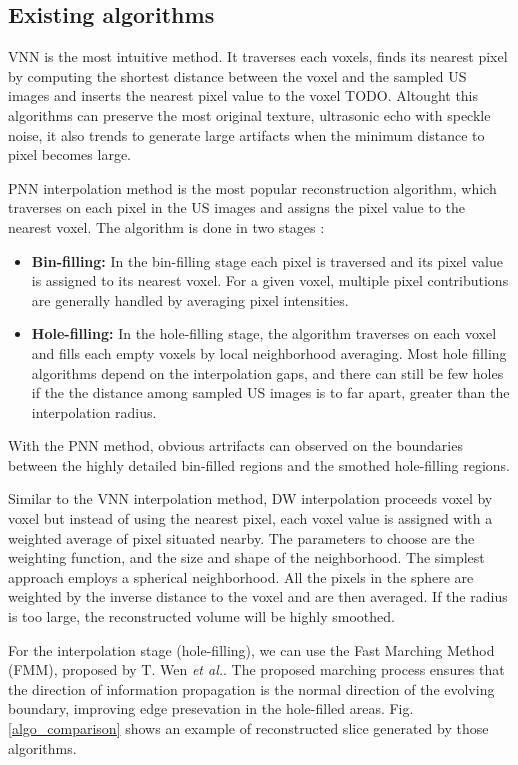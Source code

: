 \documentclass[12pt,journal,compsoc]{IEEEtran}
\begin{document}
\subsection{Existing algorithms}

VNN is the most intuitive method. It traverses each voxels, finds its nearest pixel by computing the shortest distance between the voxel and the sampled US images and inserts the nearest pixel value to the voxel TODO.
Altought this algorithms can preserve the most original texture, ultrasonic echo with speckle noise, it also trends to generate large artifacts when the minimum distance to pixel becomes large.\par

PNN interpolation method is the most popular reconstruction algorithm, which traverses on each pixel in the US images and assigns the pixel value to the nearest voxel.
The algorithm is done in two stages :
\begin{itemize}
	\item \textbf{Bin-filling:} In the bin-filling stage each pixel is traversed and its pixel value is assigned to its nearest voxel. For a given voxel, multiple pixel contributions are generally handled by averaging pixel intensities.  
	\item \textbf{Hole-filling:} In the hole-filling stage, the algorithm traverses on each voxel and fills each empty voxels by local neighborhood averaging. Most hole filling algorithms depend on the interpolation gaps, and there can still be few holes if the the distance among sampled US images is to far apart, greater than the interpolation radius. 
\end{itemize}
With the PNN method, obvious artrifacts can observed on the boundaries between the highly detailed bin-filled regions and the smothed hole-filling regions.\par

Similar to the VNN interpolation method, DW interpolation proceeds voxel by voxel but instead of using the nearest pixel, each voxel value is assigned with a weighted average of pixel situated nearby. The parameters to choose are the weighting function, and the size and shape of the neighborhood. The simplest approach employs a spherical neighborhood. All the pixels in the sphere are weighted by the inverse distance to the voxel and are then averaged. If the radius is too large, the reconstructed volume will be highly smoothed.

For the interpolation stage (hole-filling), we can use the Fast Marching Method (FMM), proposed by T. Wen \textit{et al.}\cite{2}. The proposed marching process ensures that the direction of information propagation is the normal direction of the evolving boundary, improving edge presevation in the hole-filled areas.
Fig.\ref{algo_comparison} shows an example of reconstructed slice generated by those algorithms.
\end{document}
